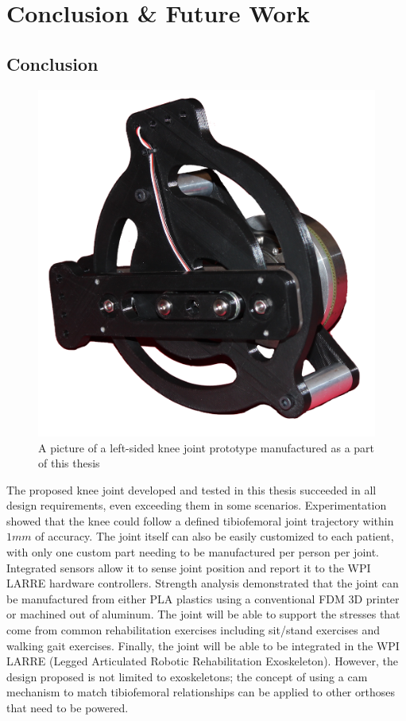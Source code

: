 \chapter{Conclusion \& Future Work}

\section{Conclusion}

\begin{figure}[ht!]
    \centering
    \includegraphics[width=0.7\linewidth]{Figures/KneeJointPrototype_ClearBackground.png}
    \caption{A picture of a left-sided knee joint prototype manufactured as a part of this thesis}
    \label{fig:KneeJointPicture}
\end{figure}

The proposed knee joint developed and tested in this thesis succeeded in all design requirements, even exceeding them in some scenarios. Experimentation showed that the knee could follow a defined tibiofemoral joint trajectory within \(1mm\) of accuracy. The joint itself can also be easily customized to each patient, with only one custom part needing to be manufactured per person per joint. Integrated sensors allow it to sense joint position and report it to the WPI LARRE hardware controllers. Strength analysis demonstrated that the joint can be manufactured from either PLA plastics using a conventional FDM 3D printer or machined out of aluminum. The joint will be able to support the stresses that come from common rehabilitation exercises including sit/stand exercises and walking gait exercises. Finally, the joint will be able to be integrated in the WPI LARRE (Legged Articulated Robotic Rehabilitation Exoskeleton). However, the design proposed is not limited to exoskeletons; the concept of using a cam mechanism to match tibiofemoral relationships can be applied to other orthoses that need to be powered.

